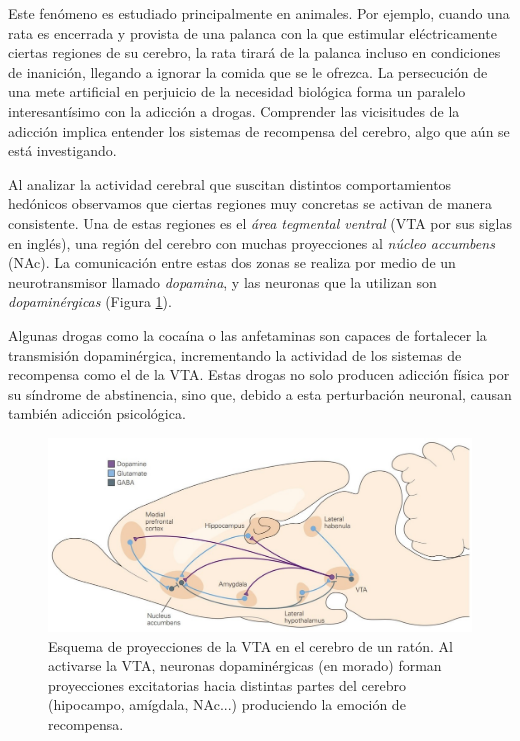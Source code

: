 Este fenómeno es estudiado principalmente en animales. Por ejemplo, cuando una rata es encerrada y provista de una palanca con la que estimular eléctricamente ciertas regiones de su cerebro, la rata tirará de la palanca incluso en condiciones de inanición, llegando a ignorar la comida que se le ofrezca. La persecución de una mete artificial en perjuicio de la necesidad biológica forma un paralelo interesantísimo con la adicción a drogas. Comprender las vicisitudes de la adicción implica entender los sistemas de recompensa del cerebro, algo que aún se está investigando.

Al analizar la actividad cerebral que suscitan distintos comportamientos hedónicos observamos que ciertas regiones muy concretas se activan de manera consistente. Una de estas regiones es el \textit{área tegmental ventral} (VTA por sus siglas en inglés), una región del cerebro con muchas proyecciones al \textit{núcleo accumbens} (NAc). La comunicación entre estas dos zonas se realiza por medio de un neurotransmisor llamado \textit{dopamina}, y las neuronas que la utilizan son \textit{dopaminérgicas} (Figura \ref{ratbrain}).

Algunas drogas como la cocaína o las anfetaminas son capaces de fortalecer la transmisión dopaminérgica, incrementando la actividad de los sistemas de recompensa como el de la VTA. Estas drogas no solo producen adicción física por su síndrome de abstinencia, sino que, debido a esta perturbación neuronal, causan también adicción psicológica.

\begin{figure}[H]
	\centering
	\includegraphics[width=\linewidth]{media/8-ratbrain.png}
	\caption{Esquema de proyecciones de la VTA en el cerebro de un ratón. Al activarse la VTA, neuronas dopaminérgicas (en morado) forman proyecciones excitatorias hacia distintas partes del cerebro (hipocampo, amígdala, NAc...) produciendo la emoción de recompensa.}
	\label{ratbrain}
\end{figure}

